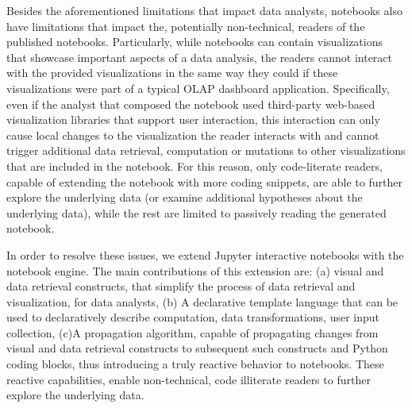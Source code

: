 Besides the aforementioned limitations that impact data analysts, notebooks also have limitations that impact the, potentially non-technical, readers of the published notebooks. Particularly, while notebooks can contain visualizations that showcase important aspects of a data analysis, the readers cannot interact with the provided visualizations in the same way they could if these visualizations were part of a typical OLAP dashboard application. Specifically, even if the analyst that composed the notebook used third-party web-based visualization libraries that support user interaction, this interaction can only cause local changes to the visualization the reader interacts with and cannot trigger additional data retrieval, computation or mutations to other visualizations that are included in the notebook. For this reason, only code-literate readers, capable of extending the notebook with more coding snippets, are able to further explore the underlying data (or examine additional hypotheses about the underlying data), while the rest are limited to passively reading the generated notebook.



In order to resolve these issues, we extend Jupyter interactive notebooks with the  {\projname} notebook engine. The main contributions of this extension are: (a) visual and data retrieval constructs, that simplify the process of data retrieval and visualization, for data analysts, (b) A declarative template language that can be used to declaratively describe computation, data transformations, user input collection, (c)A propagation algorithm, capable of propagating changes from visual and data retrieval constructs to subsequent such constructs and Python coding blocks, thus introducing a truly reactive behavior to notebooks. These reactive capabilities, enable non-technical, code illiterate  readers to further explore the underlying data.

